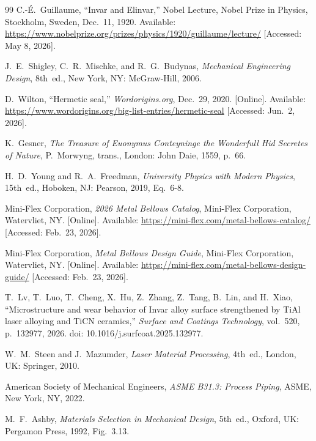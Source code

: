 \documentclass[12pt, letterpaper]{report}%
\begin{document}
\begin{thebibliography}{99}
	C.-\'{E}.\ Guillaume, ``Invar and Elinvar,'' Nobel Lecture,
	Nobel Prize in Physics, Stockholm, Sweden, Dec.\ 11, 1920.
	Available: \url{https://www.nobelprize.org/prizes/physics/1920/guillaume/lecture/}
	[Accessed: May 8, 2026].

	J.\ E.\ Shigley, C.\ R.\ Mischke, and R.\ G.\ Budynas,
	\textit{Mechanical Engineering Design},
	8th~ed., New York, NY: McGraw-Hill, 2006.

	D.\ Wilton, ``Hermetic seal,'' \textit{Wordorigins.org}, Dec.\ 29, 2020.
	[Online]. Available: \url{https://www.wordorigins.org/big-list-entries/hermetic-seal}
	[Accessed: Jun.\ 2, 2026].

	K.\ Gesner, \textit{The Treasure of Euonymus Conteyninge the Wonderfull Hid
	Secretes of Nature}, P.\ Morwyng, trans., London: John Daie, 1559, p.~66.

	H.\ D.\ Young and R.\ A.\ Freedman,
	\textit{University Physics with Modern Physics},
	15th~ed., Hoboken, NJ: Pearson, 2019, Eq.~6-8.

	Mini-Flex Corporation, \textit{2026 Metal Bellows Catalog},
	Mini-Flex Corporation, Watervliet, NY. [Online].
	Available: \url{https://mini-flex.com/metal-bellows-catalog/}
	[Accessed: Feb.\ 23, 2026].

	Mini-Flex Corporation, \textit{Metal Bellows Design Guide},
	Mini-Flex Corporation, Watervliet, NY. [Online].
	Available: \url{https://mini-flex.com/metal-bellows-design-guide/}
	[Accessed: Feb.\ 23, 2026].

	T.\ Lv, T.\ Luo, T.\ Cheng, X.\ Hu, Z.\ Zhang, Z.\ Tang, B.\ Lin, and H.\ Xiao,
	``Microstructure and wear behavior of Invar alloy surface strengthened by
	{TiAl} laser alloying and {TiCN} ceramics,''
	\textit{Surface and Coatings Technology}, vol.~520, p.~132977, 2026.
	doi: 10.1016/j.surfcoat.2025.132977.

	W.\ M.\ Steen and J.\ Mazumder, \textit{Laser Material Processing},
	4th~ed., London, UK: Springer, 2010.

	American Society of Mechanical Engineers,
	\textit{ASME B31.3: Process Piping},
	ASME, New York, NY, 2022.

	M.\ F.\ Ashby, \textit{Materials Selection in Mechanical Design},
	5th~ed., Oxford, UK: Pergamon Press, 1992, Fig.~3.13.


\end{thebibliography}
\end{document}
